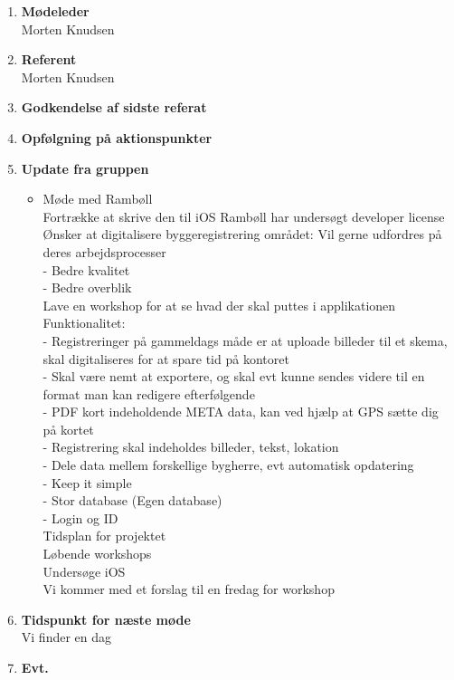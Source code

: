 	\begin{enumerate}
		\itemsep 0.3em 
		\item \textbf{Mødeleder}\\
			Morten Knudsen
		\item \textbf{Referent}\\
			Morten Knudsen
		\item \textbf{Godkendelse af sidste referat}
			
		\item\textbf{ Opfølgning på aktionspunkter}

		\item \textbf{Update fra gruppen}
			\begin{itemize}[-]
			\item Møde med Rambøll\\
				Fortrække at skrive den til iOS
				Rambøll har undersøgt developer license
				Ønsker at digitalisere byggeregistrering området:
				Vil gerne udfordres på deres arbejdsprocesser \\
				 - Bedre kvalitet \\
				 - Bedre overblik \\
				 Lave en workshop for at se hvad der skal puttes i applikationen \\
				 
				Funktionalitet: \\
				- Registreringer på gammeldags måde er at uploade billeder til et skema, skal digitaliseres for at spare tid på kontoret \\
				- Skal være nemt at exportere, og skal evt kunne sendes videre til en format man kan redigere efterfølgende \\
				- PDF kort indeholdende META data, kan ved hjælp at GPS sætte dig på kortet \\
				- Registrering skal indeholdes billeder, tekst, lokation \\
				- Dele data mellem forskellige bygherre, evt automatisk opdatering \\
				- Keep it simple \\
				- Stor database (Egen database) \\
				- Login og ID \\
				
				Tidsplan for projektet \\
				Løbende workshops \\
				Undersøge iOS \\
				Vi kommer med et forslag til en fredag for workshop \\
			
		\end{itemize}	
		\item \textbf{Tidspunkt for næste møde}\\
		Vi finder en dag
		\item \textbf{Evt.}
	\end{enumerate}
